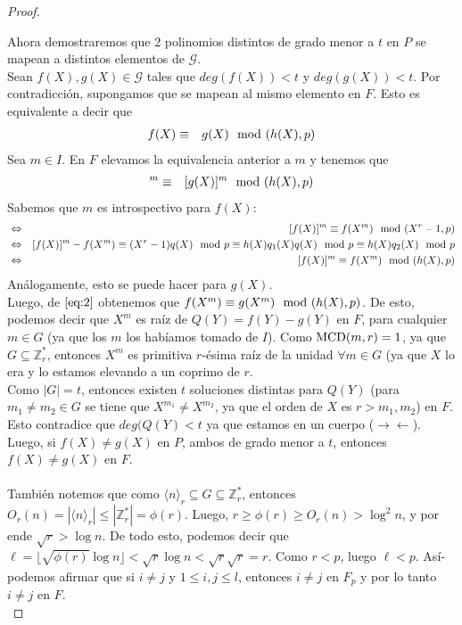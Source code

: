 \begin{proof}
\begin{enumerate}
		\end{enumerate}
		Ahora demostraremos que 2 polinomios distintos de grado menor a $t$ en $P$ se mapean a distintos elementos de $\mathcal{G}$.\\
		Sean $f(X),g(X)\in \mathcal{G}$ tales que $deg(f(X))<t$ y $deg(g(X))<t$. Por contradicción, supongamos que se mapean al mismo elemento en $F$. Esto es equivalente a decir que 
		\begin{eqnarray}
			f(X)&\equiv & g(X)\mod (h(X),p)\nonumber
		\end{eqnarray} 
		Sea $m\in I$. En $F$ elevamos la equivalencia anterior a $m$ y tenemos que
		\begin{eqnarray}
			[f(X)]^m&\equiv &[g(X)]^m\modulohp\label{eq:2}
		\end{eqnarray}			    
		Sabemos que $m$ es introspectivo para $f(X)$:
		\begin{eqnarray}
			&\Leftrightarrow &[f(X)]^m \equiv f(X^m) \mod (X^r-1,p)\nonumber\\
			&\Leftrightarrow &[f(X)]^m - f(X^m) \equiv (X^r-1)q(X) \mod p \equiv h(X)q_1(X)q(X) \mod p\equiv h(X)q_2(X) \mod p \nonumber\\
			&\Leftrightarrow &[f(X)]^m \equiv f(X^m) \mod (h(X),p)\nonumber
		\end{eqnarray}
		Análogamente, esto se puede hacer para $g(X)$.\\
		Luego, de $\eqref{eq:2}$ obtenemos que $f(X^m) \equiv g(X^m) \mod (h(X),p)$. De esto, podemos decir que $X^m$ es raí­z de $Q(Y)=f(Y)-g(Y)$ en $F$, para cualquier $m\in G$ (ya que los $m$ los habí­amos tomado de $I$). Como ${\rm MCD}(m,r)=1$, ya que $G\subseteq \mathbb{Z}_r^*$, entonces $X^m$ es primitiva $r$-ésima raí­z de la unidad $\forall m \in G$ (ya que $X$ lo era y lo estamos elevando a un coprimo de $r$.\\
		Como $|G| = t$, entonces existen $t$ soluciones distintas para $Q(Y)$ (para $m_1\neq m_2 \in G$ se tiene que $X^{m_1}\neq X^{m_2}$, ya que el orden de $X$ es $r>m_1,m_2$) en $F$. Esto contradice que $deg(Q(Y)<t$ ya que estamos en un cuerpo ($\rightarrow\leftarrow$).\\
		Luego, si $f(X)\neq g(X)$ en $P$, ambos de grado menor a $t$, entonces $f(X)\neq g(X)$ en $F$.\\\\
		También notemos que como $\langle n\rangle _r\subseteq G\subseteq \mathbb{Z}_r^*$, entonces $O_r(n)=|\langle n\rangle _r|\leq |\mathbb{Z}_r^*|=\phi(r)$. Luego, $r\geq\phi(r)\geq O_r(n)>\log ^2 n$, y por ende $\sqrt{r}>\log  n$. De todo esto, podemos decir que $\ell =\lfloor \sqrt{\phi(r)}\log  n\rfloor < \sqrt{r}\log  n<\sqrt{r}\sqrt{r}=r$. Como $r<p$, luego $\ell <p$. Así­ podemos afirmar que si $i\neq j$ y $1\leq i,j\leq l$, entonces $i\neq j$ en $F_p$ y por lo tanto $i\neq j$ en $F$.\\

\end{proof}
